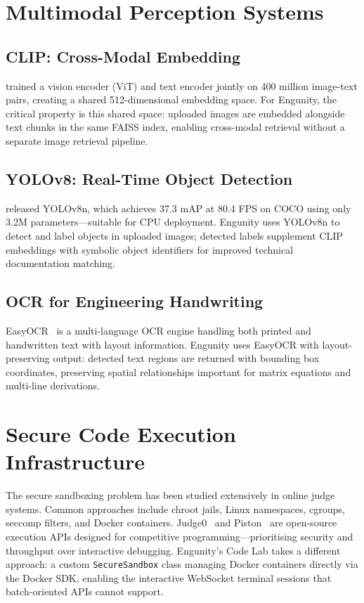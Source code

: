 \section{Multimodal Perception Systems}
\label{sec:multimodal-survey}

\subsection{CLIP: Cross-Modal Embedding}
\label{subsec:clip}

\citet{radford2021clip} trained a vision encoder (ViT) and text encoder jointly on 400 million image-text pairs, creating a shared 512-dimensional embedding space. For Engunity, the critical property is this shared space: uploaded images are embedded alongside text chunks in the same FAISS index, enabling cross-modal retrieval without a separate image retrieval pipeline.

\subsection{YOLOv8: Real-Time Object Detection}
\label{subsec:yolo}

\citet{jocher2023yolov8} released YOLOv8n, which achieves 37.3 mAP at 80.4 FPS on COCO using only 3.2M parameters---suitable for CPU deployment. Engunity uses YOLOv8n to detect and label objects in uploaded images; detected labels supplement CLIP embeddings with symbolic object identifiers for improved technical documentation matching.

\subsection{OCR for Engineering Handwriting}
\label{subsec:ocr}

EasyOCR~\citep{easyocr2020} is a multi-language OCR engine handling both printed and handwritten text with layout information. Engunity uses EasyOCR with layout-preserving output: detected text regions are returned with bounding box coordinates, preserving spatial relationships important for matrix equations and multi-line derivations.

\section{Secure Code Execution Infrastructure}
\label{sec:sandbox-survey}

The secure sandboxing problem has been studied extensively in online judge systems. Common approaches include chroot jails, Linux namespaces, cgroups, seccomp filters, and Docker containers. Judge0~\citep{judge0} and Piston~\citep{piston} are open-source execution APIs designed for competitive programming---prioritising security and throughput over interactive debugging. Engunity's Code Lab takes a different approach: a custom \texttt{SecureSandbox} class managing Docker containers directly via the Docker SDK, enabling the interactive WebSocket terminal sessions that batch-oriented APIs cannot support.

